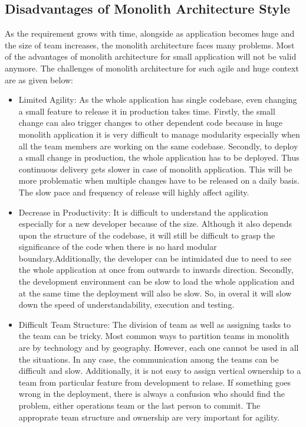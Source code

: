 \subsection{Disadvantages of Monolith Architecture Style}\label{subsection:context/monolith-disadvantages}
As the requirement grows with time, alongside as application becomes huge and the size of team increases, the monolith architecture faces many problems. Most of the advantages of monolith architecture for small application will not be valid anymore. The challenges of monolith architecture for such agile and huge context are as given below:\cite{Namiot:2014aa}\cite{Newman:2015aa}\cite{Abram:2014aa}\cite{Richardson:2014aa}\cite{Richardson:2014ab}\cite{Gupta:2015aa}
\begin{itemize}[leftmargin=.5in]
\item Limited Agility: As the whole application has single codebase, even changing a small feature to release it in production takes time. Firstly, the small change can also trigger changes to other dependent code because in huge monolith application it is very difficult to manage modularity especially when all the team members are working on the same codebase. Secondly, to deploy a small change in production, the whole application has to be deployed. Thus continuous delivery gets slower in case of monolith application. This will be more problematic when multiple changes have to be released on a daily basis. The slow pace and frequency of release will highly affect agility.
\\
\item Decrease in Productivity: It is difficult to understand the application especially for a new developer because of the size. Although it also depends upon the structure of the codebase, it will still be difficult to grasp the significance of the code when there is no hard modular boundary.Additionally, the developer can be intimidated due to need to see the whole application at once from outwards to inwards direction. Secondly, the development environment can be slow to load the whole application and at the same time the deployment will also be slow. So, in overal it will slow down the speed of understandability, execution and testing.
\\
\item Difficult Team Structure: The division of team as well as assigning tasks to the team can be tricky. Most common ways to partition teams in monolith are by technology and by geography. However, each one cannot be used in all the situations. In any case, the communication among the teams can be difficult and slow. Additionally, it is not easy to assign vertical ownership to a team from particular feature from development to relase. If something goes wrong in the deployment, there is always a confusion who should find the problem, either operations team or the last person to commit. The approprate team structure and ownership are very important for agility.

\end{itemize}

